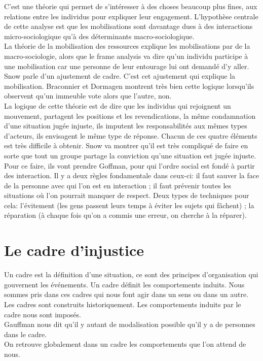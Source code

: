 \documentclass[10pt, a4paper, openany]{book}
\begin{document}
C'est une théorie qui permet de s'intéresser à des choses beaucoup plus fines, aux relations entre les individus pour expliquer leur engagement. L'hypothèse centrale de cette analyse est que les mobilisations sont davantage dues à des interactions micro-sociologique qu'à des déterminants macro-sociologique. \\
La théorie de la mobilisation des ressources explique les mobilisations par de la macro-sociologie, alors que le frame analysis va dire qu'un individu participe à une mobilisation car une personne de leur entourage lui ont demandé d'y aller. \\
Snow parle d'un ajustement de cadre. C'est cet ajustement qui explique la mobilisation. Braconnier et Dormagen montrent très bien cette logique lorsqu'ils observent qu'un immeuble vote alors que l'autre, non. \\
La logique de cette théorie est de dire que les individus qui rejoignent un mouvement, partagent les positions et les revendications, la même condamnation d'une situation jugée injuste, ils imputent les responsabilités aux mêmes types d'acteurs, ils envisagent le même type de réponse. Chacun de ces quatre éléments est très difficile à obtenir. Snow va montrer qu'il est très compliqué de faire en sorte que tout un groupe partage la conviction qu'une situation est jugée injuste. Pour ce faire, ils vont prendre Goffman, pour qui l'ordre social est fondé à partir des interaction. Il y a deux règles fondamentale dans ceux-ci: il faut sauver la face de la personne avec qui l'on est en interaction ; il faut prévenir toutes les situations où l'on pourrait manquer de respect. Deux types de techniques pour cela: l'évitement (les gens passent leurs temps à éviter les sujets qui fâchent) ; la réparation (à chaque fois qu'on a commis une erreur, on cherche à la réparer). 

\section{Le cadre d'injustice}

Un cadre est la définition d'une situation, ce sont des principes d'organisation qui gouvernent les événements. Un cadre définit les comportements induits. Nous sommes pris dans ces cadres qui nous font agir dans un sens ou dans un autre. Les cadres sont construits historiquement. Les comportements induits par le cadre nous sont imposés. \\
Gauffman nous dit qu'il y autant de modalisation possible qu'il y a de personnes dans le cadre. \\
On retrouve globalement dans un cadre les comportements que l'on attend de nous. 
\end{document}
